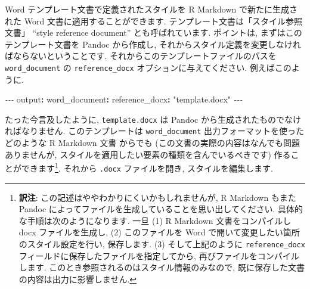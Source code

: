 \documentclass[
  11pt,
  lualatex,
  ja=standard]{bxjsreport}
\newenvironment{Shaded}{\begin{snugshade}}{\end{snugshade}}
\newcommand{\AttributeTok}[1]{\textcolor[rgb]{0.77,0.63,0.00}{#1}}
\newcommand{\FunctionTok}[1]{\textcolor[rgb]{0.00,0.00,0.00}{#1}}
\newcommand{\KeywordTok}[1]{\textcolor[rgb]{0.13,0.29,0.53}{\textbf{#1}}}
\newcommand{\PreprocessorTok}[1]{\textcolor[rgb]{0.56,0.35,0.01}{\textit{#1}}}
\newcommand{\StringTok}[1]{\textcolor[rgb]{0.31,0.60,0.02}{#1}}
\begin{document}
Word テンプレート文書で定義されたスタイルを R Markdown で新たに生成された Word 文書に適用することができます. テンプレート文書は「スタイル参照文書」 ``style reference document'' とも呼ばれています. ポイントは, まずはこのテンプレート文書を Pandoc から作成し, それからスタイル定義を変更しなければならないということです. それからこのテンプレートファイルのパスを \texttt{word\_document} の \texttt{reference\_docx} オプションに与えてください. 例えばこのように.

\begin{Shaded}
\begin{Highlighting}[]
\PreprocessorTok{{-}{-}{-}}
\FunctionTok{output}\KeywordTok{:}
\AttributeTok{  }\FunctionTok{word\_document}\KeywordTok{:}
\AttributeTok{    }\FunctionTok{reference\_docx}\KeywordTok{:}\AttributeTok{ }\StringTok{"template.docx"}
\PreprocessorTok{{-}{-}{-}}
\end{Highlighting}
\end{Shaded}

たった今言及したように, \texttt{template.docx} は Pandoc から生成されたものでなければなりません. このテンプレートは \texttt{word\_document} 出力フォーマットを使ったどのような R Markdown 文書 からでも (この文書の実際の内容はなんでも問題ありませんが, スタイルを適用したい要素の種類を含んでいるべきです) 作ることができます\footnote{\textbf{訳注}: この記述はややわかりにくいかもしれませんが, R Markdown もまた Pandoc によってファイルを生成していることを思い出してください. 具体的な手順は次のようになります. 一旦 (1) R Markdown 文書をコンパイルし docx ファイルを生成し, (2) このファイルを Word で開いて変更したい箇所のスタイル設定を行い, 保存します. (3) そして上記のように \texttt{reference\_docx} フィールドに保存したファイルを指定してから, 再びファイルをコンパイルします. このとき参照されるのはスタイル情報のみなので, 既に保存した文書の内容は出力に影響しません.}. それから \texttt{.docx} ファイルを開き, スタイルを編集します.
\end{document}
